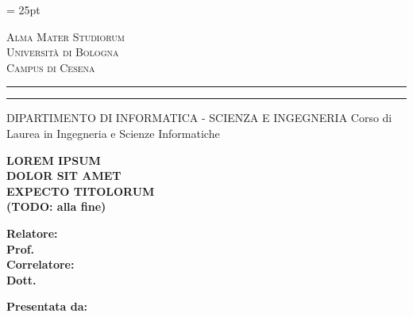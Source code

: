 \oddsidemargin = 25pt

\begin{titlepage}
    \begin{center}
    {
        {\Large{\textsc{Alma Mater Studiorum}}} \\
        {\Large{\textsc{Università di Bologna}}} \\
        {\textsc{Campus di Cesena}}
        \vspace{-1mm}
    }
    \end{center}
    \begin{center}
    {
        \rule[0.1cm]{\textwidth}{0.1mm}
        \rule[0.5cm]{\textwidth}{0.6mm}
        DIPARTIMENTO DI INFORMATICA - SCIENZA E INGEGNERIA
        Corso di Laurea in Ingegneria e Scienze Informatiche
    }
    \end{center}

    \vspace{2.25cm} %

    \begin{center}
        {\LARGE{\textbf{LOREM IPSUM}}} \\
        \vspace{0.4cm}
        {\LARGE{\textbf{DOLOR SIT AMET}}} \\
        \vspace{0.4cm}
        {\LARGE{\textbf{EXPECTO TITOLORUM}}} \\
        \vspace{0.4cm}
        {\LARGE{\textbf{(TODO: alla fine)}}}
    \end{center}

    \vspace{2.25cm} %
    \par
    \noindent
    \begin{minipage}[t]{0.47\textwidth}
        {\large{\textbf{Relatore:}}} \\
        {\large{\textbf{Prof. \xsupervisor}}}
        \vspace{5mm}
        {\large{\bf \\Correlatore:\\
        Dott. \xcorrelatore}}
    \end{minipage}
    \hfill
    \begin{minipage}[t]{0.47\textwidth}\raggedleft
        {\large{\textbf{Presentata da:} \\
        {\large{\textbf{\xstudent}}}}}
    \end{minipage}


\end{titlepage}
